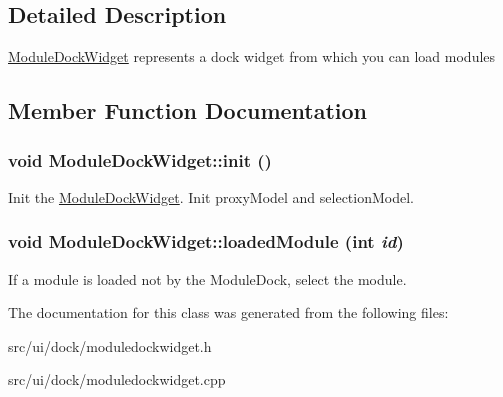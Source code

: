 \subsection{Detailed Description}
\hyperlink{classModuleDockWidget}{ModuleDockWidget} represents a dock widget from which you can load modules 

\subsection{Member Function Documentation}
\hypertarget{classModuleDockWidget_acdce295969ddf4230362ccc87bc8be42}{
\subsubsection[{init}]{\setlength{\rightskip}{0pt plus 5cm}void ModuleDockWidget::init ()}}
\label{classModuleDockWidget_acdce295969ddf4230362ccc87bc8be42}
Init the \hyperlink{classModuleDockWidget}{ModuleDockWidget}. Init proxyModel and selectionModel. \hypertarget{classModuleDockWidget_adacdb1e6fbfb1f3be9537dfc8adc2ec9}{
\subsubsection[{loadedModule}]{\setlength{\rightskip}{0pt plus 5cm}void ModuleDockWidget::loadedModule (int {\em id})}}
\label{classModuleDockWidget_adacdb1e6fbfb1f3be9537dfc8adc2ec9}
If a module is loaded not by the ModuleDock, select the module. 

The documentation for this class was generated from the following files:\begin{DoxyCompactItemize}
\item 
src/ui/dock/moduledockwidget.h\item 
src/ui/dock/moduledockwidget.cpp\end{DoxyCompactItemize}
